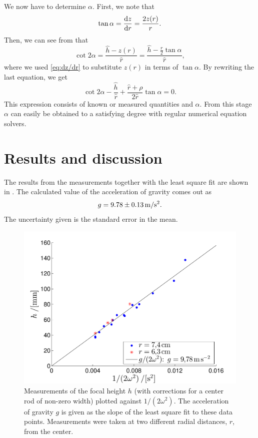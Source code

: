 \documentclass[11pt, a4paper, twocolumn, swedish, english]{article}
\begin{document}
We now have to determine $\alpha$. First, we note that
\begin{equation}\label{eq:dz/dr}
\tan\alpha=\dv{z}{r} =\frac{2 z(r)}{r}.
\end{equation}
Then, we can see from  that 
\begin{equation}
\cot 2\alpha =\frac{\hat{h} - z(r)}{\hat{r}} 
= \frac{\hat{h}-\frac{r}{2}\tan\alpha }{\hat{r}},
\end{equation}
where we used \eqref{eq:dz/dr} to substitute $z(r)$ in terms of
$\tan\alpha$. By rewriting the last equation, we get
\begin{equation}
\cot 2\alpha 
-\frac{\hat{h}}{\hat{r}}
+\frac{\hat{r}+\rho}{2\hat{r}}\tan\alpha  = 0.
\end{equation}
This expression consists of known or measured quantities and $\alpha$. From
this stage $\alpha$ can easily be obtained to a satisfying degree with
regular numerical equation solvers.


\section{Results and discussion}

The results from the measurements together with the least square fit
are shown in . The calculated value of the
acceleration of gravity comes out as
\begin{equation}
g=\unit[9.78\pm 0.13]{m/s^2}.
\end{equation}
The uncertainty given is the standard error in the mean.

\begin{figure}\centering 
\includegraphics[width=.8\linewidth]{g_minsta_kvadrat.pdf}
\caption{\label{fig:data} Measurements of the focal height $h$ (with
  corrections for a center rod of non-zero width) plotted against
  $1/(2\omega^2)$. The acceleration of gravity $g$ is given as the
  slope of the least square fit to these data points. Measurements
  were taken at two different radial distances, $r$, from the center.
}
\end{figure}
\end{document}
